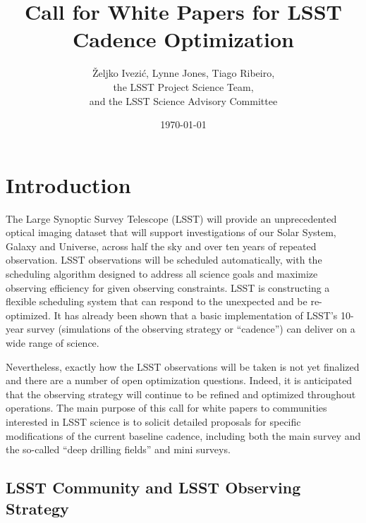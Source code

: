 \documentclass[DM,lsstdraft,toc,usenatbib]{lsstdoc}
\title[Call for LSST Cadence White Papers]{Call for White Papers for LSST Cadence Optimization}
\author{\v{Z}eljko Ivezi\'{c}, Lynne Jones, Tiago Ribeiro, \\
                 the LSST Project Science Team, \\
                 and  the LSST Science Advisory Committee}
\date{\today}
\begin{document}
\maketitle


\section{Introduction} 

The Large Synoptic Survey Telescope (LSST) will provide an unprecedented optical 
imaging dataset that will support investigations of our Solar System, Galaxy and Universe, 
across half the sky and over ten years of repeated observation. LSST observations will be
scheduled automatically, with the scheduling algorithm designed to address all science goals 
and maximize observing efficiency for given observing constraints. LSST is constructing a 
flexible scheduling system that can respond to the unexpected and be re-optimized. 
It has already been shown that a basic implementation of LSST's 10-year survey (simulations of 
the observing strategy or ``cadence'') can deliver on a wide range of science. 

Nevertheless, exactly how the LSST observations will be taken is not yet finalized and there
are a number of open optimization questions. Indeed, it is anticipated that the observing strategy 
will continue to be refined and optimized throughout operations. The main purpose of this 
call for white papers to communities interested in LSST science is to solicit detailed proposals
for specific modifications of the current baseline cadence, including both the main survey and 
the so-called ``deep drilling fields'' and mini surveys. 


\subsection{LSST Community and LSST Observing Strategy}
\end{document}
